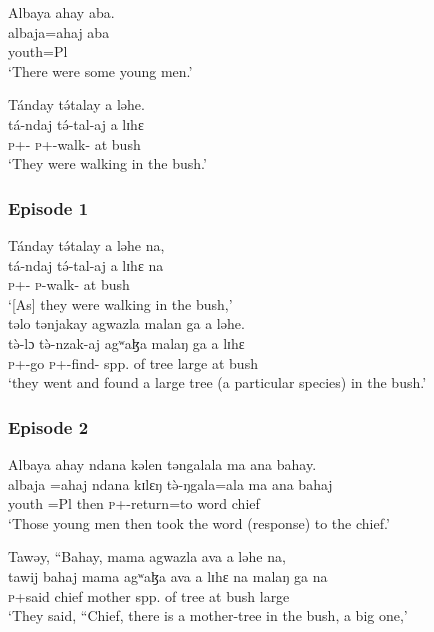 \ea Albaya  ahay  aba.\\
 \gll albaja=ahaj              aba\\
        youth=Pl    {\EXT}\\
 \glt ‘There were some young men.’
  \z

\ea Tánday  t\'ətalay  a  ləhe.\\
 \gll tá{}-ndaj         t\'ə{}-tal-aj           a  lɪhɛ\\
   \textsc{p}+{\IFV}-{\PRG}   \textsc{p}+{\IFV}-walk{}-{\CL}   at    bush\\
 \glt ‘They were walking in the bush.’
 \z
 \subsubsection*{Episode 1}
\ea      Tánday  t\'ətalay  a  ləhe  na,\\
\gll tá-ndaj        t\'ə-tal-aj    a   lɪhɛ     na\\
  \textsc{p}+{\IFV}-{\PRG}   \textsc{p}-walk{}-{\CL}   at  bush   {\PSP}\\
\glt ‘[As] they were walking in the bush,’\\
         
     \medskip
təlo  tənjakay  agwazla  malan  ga  a  ləhe.  \\
\gll t\`ə-lɔ           t\`ə-nzak-aj        agʷaɮa   malaŋ  ga      a    lɪhɛ\\
 \textsc{p}+{\PFV}-go   \textsc{p}+{\PFV}-find{}-{\CL}   {spp. of tree}     large   {\ADJ}  at   bush\\
\glt `they went and found a large tree (a particular species) in the bush.’
 \z
\subsubsection*{Episode 2}
\ea Albaya  ahay  ndana  kəlen  təngalala  ma  ana  bahay.  \\
\gll albaja  =ahaj  ndana  kɪlɛŋ  t\`ə-ŋgala=ala     ma    ana      bahaj\\
          youth    =Pl       {\DEM}  then \textsc{p}+{\PFV}-return=to  word    {\DAT} chief\\
        \glt ‘Those young men then took the word (response) to the chief.’  
 \z

\ea     Tawəy,  “Bahay,  mama  agwazla  ava  a  ləhe  na,   \\
\gll tawij bahaj mama   agʷaɮa       ava  a   lɪhɛ  na   malaŋ ga  na\\
  \textsc{p}+said  chief   mother   {spp. of tree}  {\EXT}   at   bush    {\PSP}  large     {\ADJ}  {\PSP}\\
 \glt ‘They said, “Chief, there is a mother-tree in the bush, a big one,’\\
 
